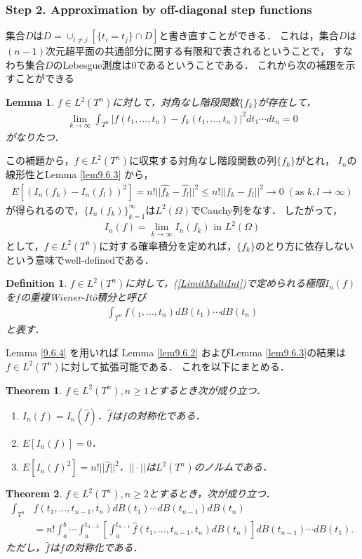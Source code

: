 \documentclass[a4paper,10pt]{jsarticle}
\theoremstyle{plain}
\newtheorem{theorem}{Theorem}
\newtheorem{definition}{Definition}
\newtheorem{lemma}{Lemma}
\newcommand{\eq}[1]{\begin{align}#1\end{align}}
\newcommand{\enums}[1]{\begin{enumerate}#1\end{enumerate}}
\begin{document}
\subsubsection*{Step 2. Approximation by off-diagonal step functions}
集合$D$は$D=\cup_{i\neq j}[\{t_i=t_j\}\cap D]$と書き直すことができる．
これは，集合$D$は$(n-1)$次元超平面の共通部分に関する有限和で表されるということで，
すなわち集合$D$のLebesgue測度は$0$であるということである．
これから次の補題を示すことができる
\begin{lemma}\label{lem9.6.4}
$f\in L^2(T^n)$に対して，対角なし階段関数$\{f_k\}$が存在して，
\eq{\lim_{k\rightarrow\infty}\int_{T^n}\left|f(t_1,...,t_n)-f_k(t_1,...,t_n)\right|^2dt_1\cdots dt_n=0}
がなりたつ．
\end{lemma}
この補題から，$f\in L^2(T^n)$に収束する対角なし階段関数の列$\{f_k\}$がとれ，
$I_n$の線形性とLemma \ref{lem9.6.3} から，
\eq{E\left[\left(I_n(f_k)-I_n(f_l)\right)^2\right]=n!||\hat{f_k}-\hat{f_l}||^2\le n!||f_k-f_l||^2\rightarrow0\;(\text{as }k,l\rightarrow\infty)}
が得られるので，$\{I_n(f_k)\}_{k=1}^\infty$は$L^2(\Omega)$でCauchy列をなす．
したがって，
\eq{I_n(f)=\lim_{k\rightarrow\infty}I_n(f_k)\text{ in }L^2(\Omega)\label{LimitMultiInt}}
として，$f\in L^2(T^n)$に対する確率積分を定めれば，$\{f_k\}$のとり方に依存しないという意味でwell-definedである．
\begin{definition}\label{def9.6.5}
$f\in L^2(T^n)$に対して，(\ref{LimitMultiInt})で定められる極限$I_n(f)$を$f$の重複Wiener-It\^o積分と呼び
\eq{\int_{T^n}f(_1,...,t_n)dB(t_1)\cdots dB(t_n)}
と表す．
\end{definition}
Lemma \ref{9.6.4} を用いれば Lemma \ref{lem9.6.2} およびLemma \ref{lem9.6.3}の結果は$f\in L^2(T^n)$に対して拡張可能である．
これを以下にまとめる．
\begin{theorem}\label{9.6.6}
$f\in L^2(T^n),n\ge1$とするとき次が成り立つ．
\enums{
	\item $I_n(f)=I_n(\hat{f})$．$\hat{f}$は$f$の対称化である．
	\item $E\left[I_n(f)\right]=0$．
	\item $E\left[I_n(f)^2\right]=n!||\hat{f}||^2$．$||\cdot||$は$L^2(T^n)$のノルムである．}
\end{theorem}

\begin{theorem}\label{thm9.6.7}
$f\in L^2(T^n), n\ge2$とするとき，次が成り立つ．
\eq{\int_{T^n}&f(t_1,...,t_{n-1},t_n)dB(t_1)\cdots dB(t_{n-1})dB(t_n)\\
	&=n!\int_a^b\cdots\int_a^{t_{n-2}}\left[\int_a^{t_{n-1}}\hat{f}(t_1,...,t_{n-1},t_n)dB(t_n)\right]dB(t_{n-1})\cdots dB(t_1).}
ただし，$\hat{f}$は$f$の対称化である．
\end{theorem}
\end{document}
